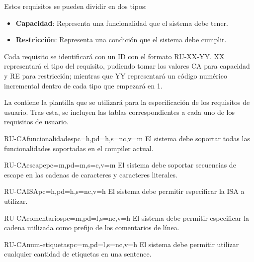 \noindent
Estos requisitos se pueden dividir en dos tipos:

\begin{itemize}
    \item \textbf{Capacidad}: Representa una funcionalidad que el sistema debe tener.
    \item \textbf{Restricción}: Representa una condición que el sistema debe cumplir.
\end{itemize}

Cada requisito se identificará con un ID con el formato RU-XX-YY. XX
representará el tipo del requisito, pudiendo tomar los valores CA para capacidad
y RE para restricción; mientras que YY representará un código numérico incremental
dentro de cada tipo que empezará en 1.

La  contiene la plantilla que se utilizará para la
especificación de los requisitos de usuario. Tras esta, se incluyen las tablas
correspondientes a cada uno de los requisitos de usuario.



\begin{userReq}{RU-CA}{funcionalidades}{pc=h,pd=h,s=nc,v=m}
    El sistema debe soportar todas las funcionalidades soportadas en el
    \gls{compiler} actual.
\end{userReq}

\begin{userReq}{RU-CA}{escape}{pc=m,pd=m,s=c,v=m}
    El sistema debe soportar secuencias de escape en las cadenas de caracteres y
    caracteres literales.
\end{userReq}

\begin{userReq}{RU-CA}{ISA}{pc=h,pd=h,s=nc,v=h}
    El sistema debe permitir especificar la \gls{ISA} a utilizar.
\end{userReq}

\begin{userReq}{RU-CA}{comentarios}{pc=m,pd=l,s=nc,v=h}
    El sistema debe permitir especificar la cadena utilizada como prefijo de los
    comentarios de línea.
\end{userReq}

\begin{userReq}{RU-CA}{num-etiquetas}{pc=m,pd=l,s=nc,v=h}
    El sistema debe permitir utilizar cualquier cantidad de etiquetas en una
    \gls{sentence}.
\end{userReq}

